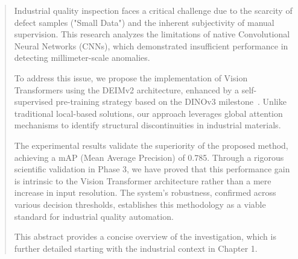     \begin{abstract}
    \noindent Industrial quality inspection faces a critical challenge due to the scarcity of defect samples ("Small Data") and the inherent subjectivity of manual supervision. This research analyzes the limitations of native Convolutional Neural Networks (CNNs), which demonstrated insufficient performance in detecting millimeter-scale anomalies.
    
    To address this issue, we propose the implementation of Vision Transformers \cite{dosovitskiy2021vit} using the DEIMv2 architecture, enhanced by a self-supervised pre-training strategy based on the DINOv3 milestone~\cite{simeoni2025dinov3}. Unlike traditional local-based solutions, our approach leverages global attention mechanisms to identify structural discontinuities in industrial materials.
    
    The experimental results validate the superiority of the proposed method, achieving a mAP (Mean Average Precision) of 0.785. Through a rigorous scientific validation in Phase 3, we have proved that this performance gain is intrinsic to the Vision Transformer architecture rather than a mere increase in input resolution. The system's robustness, confirmed across various decision thresholds, establishes this methodology as a viable standard for industrial quality automation.
    
    This abstract provides a concise overview of the investigation, which is further detailed starting with the industrial context in Chapter 1.
\end{abstract}